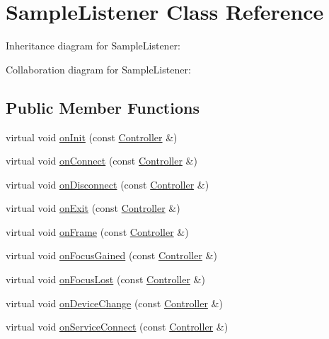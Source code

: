 \hypertarget{class_sample_listener}{}\section{Sample\+Listener Class Reference}
\label{class_sample_listener}


Inheritance diagram for Sample\+Listener\+:


Collaboration diagram for Sample\+Listener\+:
\subsection*{Public Member Functions}
\begin{DoxyCompactItemize}
\item 
virtual void \hyperlink{class_sample_listener_a8e28c251385c39ebd874f48396da7fb6}{on\+Init} (const \hyperlink{class_leap_1_1_controller}{Controller} \&)
\item 
virtual void \hyperlink{class_sample_listener_a91dfe9f4b35bca70a38237a7a09b4ebd}{on\+Connect} (const \hyperlink{class_leap_1_1_controller}{Controller} \&)
\item 
virtual void \hyperlink{class_sample_listener_a8df4ceac8fd1b88ce4bacbb068234315}{on\+Disconnect} (const \hyperlink{class_leap_1_1_controller}{Controller} \&)
\item 
virtual void \hyperlink{class_sample_listener_a60457e8e88223f71c15876f7d27d3bdd}{on\+Exit} (const \hyperlink{class_leap_1_1_controller}{Controller} \&)
\item 
virtual void \hyperlink{class_sample_listener_a39698af250954a27afb4a875ff0af38a}{on\+Frame} (const \hyperlink{class_leap_1_1_controller}{Controller} \&)
\item 
virtual void \hyperlink{class_sample_listener_a17d7075b90f556b34682eefd1f966219}{on\+Focus\+Gained} (const \hyperlink{class_leap_1_1_controller}{Controller} \&)
\item 
virtual void \hyperlink{class_sample_listener_a3b245f2961cec0c592ebdfaf797d6365}{on\+Focus\+Lost} (const \hyperlink{class_leap_1_1_controller}{Controller} \&)
\item 
virtual void \hyperlink{class_sample_listener_a2658fbd2db372f676d9d70665c637af3}{on\+Device\+Change} (const \hyperlink{class_leap_1_1_controller}{Controller} \&)
\item 
virtual void \hyperlink{class_sample_listener_a498412bdb417e605587ce25e836ff793}{on\+Service\+Connect} (const \hyperlink{class_leap_1_1_controller}{Controller} \&)

\end{DoxyCompactItemize}
